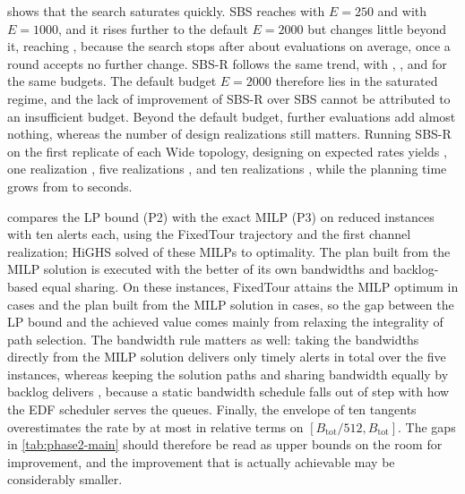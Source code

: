  shows that the search saturates quickly. SBS reaches \ResultTwoBudgetBtwoTwofivezero{} with $E=250$ and \ResultTwoBudgetBtwoOnezerozerozero{} with $E=1000$, and it rises further to the default $E=2000$ but changes little beyond it, reaching \ResultTwoBudgetBtwoFourzerozerozero, because the search stops after about \ResultTwoBudgetCallsBtwoFourzerozerozero{} evaluations on average, once a round accepts no further change. SBS-R follows the same trend, with \ResultTwoBudgetPTwofivezero, \ResultTwoBudgetPOnezerozerozero, and \ResultTwoBudgetPFourzerozerozero{} for the same budgets. The default budget $E=2000$ therefore lies in the saturated regime, and the lack of improvement of SBS-R over SBS cannot be attributed to an insufficient budget. Beyond the default budget, further evaluations add almost nothing, whereas the number of design realizations still matters. Running SBS-R on the first replicate of each Wide topology, designing on expected rates yields \ResultTwoDesignExpected, one realization \ResultTwoDesignOne, five realizations \ResultTwoDesignFive, and ten realizations \ResultTwoDesignOnezero, while the planning time grows from \ResultTwoDesignPlanningExpected{} to \ResultTwoDesignPlanningOnezero{} seconds.

\label{sec:results-milp}


 compares the LP bound (P2) with the exact MILP (P3) on \ResultMilpCount{} reduced instances with ten alerts each, using the FixedTour trajectory and the first channel realization; HiGHS solved \ResultMilpOptimalCount{} of these MILPs to optimality. The plan built from the MILP solution is executed with the better of its own bandwidths and backlog-based equal sharing. On these instances, FixedTour attains the MILP optimum in \ResultMilpMethodAtOptimumCount{} cases and the plan built from the MILP solution in \ResultMilpPlanAtOptimumCount{} cases, so the gap between the LP bound and the achieved value comes mainly from relaxing the integrality of path selection. The bandwidth rule matters as well: taking the bandwidths directly from the MILP solution delivers only \ResultMilpStaticTotal{} timely alerts in total over the five instances, whereas keeping the solution paths and sharing bandwidth equally by backlog delivers \ResultMilpEqualSplitTotal, because a static bandwidth schedule falls out of step with how the EDF scheduler serves the queues. Finally, the envelope of ten tangents overestimates the rate by at most \ResultTangentOverestimateMax{} in relative terms on $[B_{\mathrm{tot}}/512, B_{\mathrm{tot}}]$. The gaps in \cref{tab:phase2-main} should therefore be read as upper bounds on the room for improvement, and the improvement that is actually achievable may be considerably smaller.

